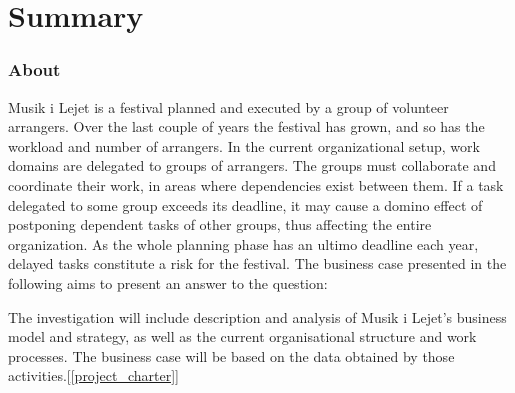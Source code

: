 \part{Summary}

\section{About}
Musik i Lejet is a festival planned and executed by a group of volunteer arrangers. Over the last
couple of years the festival has grown, and so has the workload and number of arrangers. In the
current organizational setup, work domains are delegated to groups of arrangers. The groups must
collaborate and coordinate their work, in areas where dependencies exist between them. If a task
delegated to some group exceeds its deadline, it may cause a domino effect of postponing dependent
tasks of other groups, thus affecting the entire organization. As the whole planning phase has an ultimo deadline each year, delayed tasks constitute a risk for the festival. The business case presented in the following aims to present an answer to the question:
\vspace{1pt}
\begin{center}
\end{center}
\vspace{1pt}
\noindent
The investigation will include description and analysis of Musik i Lejet's business model and strategy, as well as the current organisational structure and work processes. The business case will be based on the data obtained by those activities.[\ref{project_charter}]

